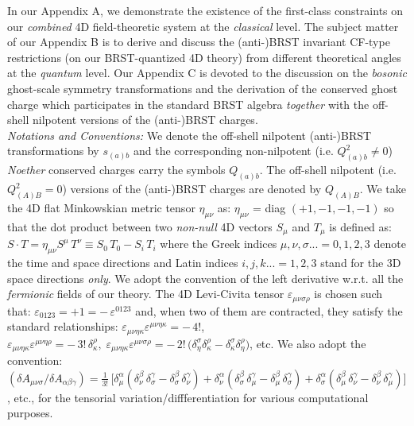 \documentclass[12pt]{article}
\begin{document}
In our Appendix A, we demonstrate the existence of the first-class constraints on our {\it combined} 4D field-theoretic system at the {\it classical} level.
The subject matter of our Appendix B is to derive and discuss the (anti-)BRST invariant CF-type restrictions 
(on our BRST-quantized 4D theory) from different theoretical angles at the {\it quantum} level. Our Appendix C is devoted to the discussion on 
the {\it bosonic} ghost-scale symmetry transformations and the derivation of the conserved ghost charge which participates in the standard 
BRST algebra {\it together} with the off-shell nilpotent versions of the (anti-)BRST charges.\\



{\it Notations and Conventions:} We denote the off-shell nilpotent (anti-)BRST transformations 
by $s_{(a)b}$ and the corresponding non-nilpotent (i.e. $Q_{(a)b}^2 \neq 0 $) {\it Noether} conserved charges carry the symbols
$Q_{(a)b}$. The off-shell nilpotent (i.e. $Q_{(A)B}^2 = 0 $) versions of the (anti-)BRST charges are denoted by $Q_{(A)B}$.
We take the 4D flat Minkowskian metric tensor $\eta_{\mu\nu}$ as: $\eta_{\mu\nu}$ = 
diag $(+ 1, -1, -1, -1)$ so that the dot product between two {\it non-null} 4D vectors $S_\mu$ and $T_\mu$ is defined as: 
$S\cdot T = \eta_{\mu\nu} S^\mu\,T^\nu \equiv S_0\, T_0 - S_i\,T_i$ where the Greek indices 
$ \mu, \nu, \sigma ... = 0, 1, 2,  3$ denote the time and space directions and Latin indices $i, j, k... = 1, 2, 3$ stand for
the 3D space directions {\it only}. 
We adopt the convention of the left derivative w.r.t. all the {\it fermionic} fields of our theory. 
The 4D Levi-Civita tensor $\varepsilon_{\mu\nu\sigma\rho}$ is chosen such that:  $\varepsilon_{0123} 
= +1 = -\, \varepsilon^{0123}$ and, when two of them are contracted,
 they satisfy the standard relationships: $\varepsilon_{\mu\nu\eta\kappa} \varepsilon^{\mu\nu\eta\kappa}= - \,4!$,
$\varepsilon_{\mu\nu\eta\kappa} \varepsilon^{\mu\nu\eta\rho}= - \,3! \,\delta^\rho_\kappa, \; \varepsilon_{\mu\nu\eta\kappa} \varepsilon^{\mu\nu\sigma\rho}= - \,2!\,
\big(\delta^\sigma_\eta \delta^\rho_\kappa - \delta^\sigma_\kappa \delta^\rho_\eta\big)$, etc. 
We also adopt the convention: $(\delta A_{\mu\nu\sigma}/\delta A_{\alpha\beta\gamma}) = \frac{1}{3!}\,\big[ \delta^\alpha_\mu (\delta^\beta_\nu \,
\delta^\gamma_\sigma - \delta^\beta_\sigma \,\delta^\gamma_\nu) +  \delta^\alpha_\nu (\delta^\beta_\sigma \,
\delta^\gamma_\mu - \delta^\beta_\mu \,\delta^\gamma_\sigma) + \delta^\alpha_\sigma (\delta^\beta_\mu \,
\delta^\gamma_\nu - \delta^\beta_\nu \,\delta^\gamma_\mu)\big]$, etc., for the tensorial variation/diffferentiation
for various computational purposes.\\
\end{document}
